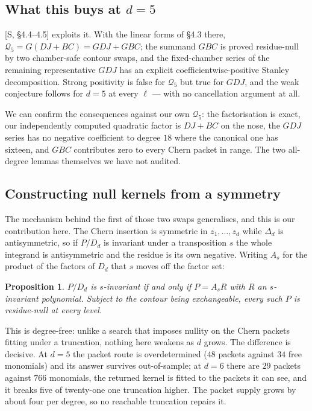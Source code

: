 \documentclass[11pt,a4paper]{article}
\newcommand{\Qd}{\mathcal{Q}}
\theoremstyle{plain}
\newtheorem{proposition}{Proposition}
\theoremstyle{definition}
\theoremstyle{remark}
\begin{document}
\subsection{What this buys at \texorpdfstring{$d = 5$}{d = 5}}

[S, \S4.4--4.5] exploits it. With the linear forms of \S4.3 there,
$\Qd_5 = G(DJ + BC) = GDJ + GBC$; the summand $GBC$ is proved residue-null by two
chamber-safe contour swaps, and the fixed-chamber series of the remaining representative
$GDJ$ has an explicit coefficientwise-positive Stanley decomposition. Strong positivity is
false for $\Qd_5$ but true for $GDJ$, and the weak conjecture follows for $d = 5$ at every
$\ell$ --- with no cancellation argument at all.

We can confirm the consequences against our own $\Qd_5$: the factorisation is exact, our
independently computed quadratic factor is $DJ + BC$ on the nose, the $GDJ$ series has no
negative coefficient to degree $18$ where the canonical one has sixteen, and $GBC$ contributes
zero to every Chern packet in range. The two all-degree lemmas themselves we have not audited.

\subsection{Constructing null kernels from a symmetry}

The mechanism behind the first of those two swaps generalises, and this is our contribution
here. The Chern insertion is symmetric in $z_1, \dots, z_d$ while $\Delta_d$ is antisymmetric,
so if $P/D_d$ is invariant under a transposition $s$ the whole integrand is antisymmetric and
the residue is its own negative. Writing $A_s$ for the product of the factors of $D_d$ that $s$
moves off the factor set:

\begin{proposition}
$P/D_d$ is $s$-invariant if and only if $P = A_s R$ with $R$ an $s$-invariant polynomial.
Subject to the contour being exchangeable, every such $P$ is residue-null at every level.
\end{proposition}

This is degree-free: unlike a search that imposes nullity on the Chern packets fitting under a
truncation, nothing here weakens as $d$ grows. The difference is decisive. At $d = 5$ the
packet route is overdetermined ($48$ packets against $34$ free monomials) and its answer
survives out-of-sample; at $d = 6$ there are $29$ packets against $766$ monomials, the returned
kernel is fitted to the packets it can see, and it breaks five of twenty-one one truncation
higher. The packet supply grows by about four per degree, so no reachable truncation repairs it.
\end{document}
